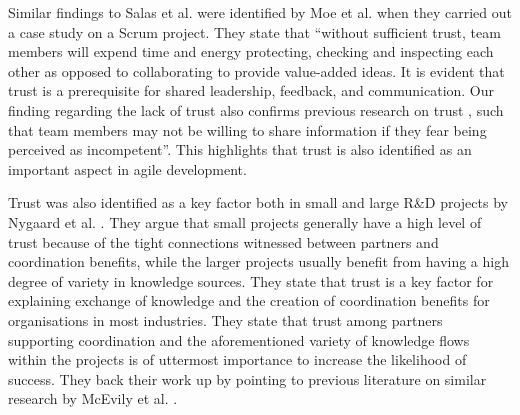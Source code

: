 Similar findings to Salas et al. \cite{Salas2005} were identified by Moe et al. \cite{Moe2012} when they carried out a case study on a Scrum project. They state that ``without sufficient trust, team members will expend time and energy protecting, checking and inspecting each other as opposed to collaborating to provide value-added ideas. It is evident that trust is a prerequisite for shared leadership, feedback, and communication. Our finding regarding the lack of trust also confirms previous research on trust \cite{Bandow2001}, such that team members may not be willing to share information if they fear being perceived as incompetent''. This highlights that trust is also identified as an important aspect in agile development.

Trust was also identified as a key factor both in small and large R\&D projects by Nygaard et al. \cite{Nygaard2008}. They argue that small projects generally have a high level of trust because of the tight connections witnessed between partners and coordination benefits, while the larger projects usually benefit from having a high degree of variety in knowledge sources. They state that trust is a key factor for explaining exchange of knowledge and the creation of coordination benefits for organisations in most industries. They state that trust among partners supporting coordination and the aforementioned variety of knowledge flows within the projects is of uttermost importance to increase the likelihood of success. They back their work up by pointing to previous literature on similar research by McEvily et al. \cite{McEvily2007}.
